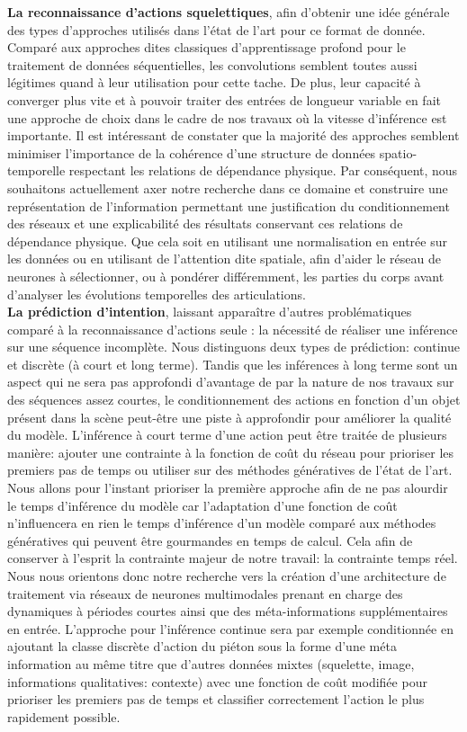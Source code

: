 \textbf{La reconnaissance d'actions squelettiques}, afin d'obtenir une idée générale des types d'approches utilisés dans l'état de l'art pour ce format de donnée. Comparé aux approches dites classiques d'apprentissage profond pour le traitement de données séquentielles, les convolutions semblent toutes aussi légitimes quand à leur utilisation pour cette tache. De plus, leur capacité à converger plus vite et à pouvoir traiter des entrées de longueur variable en fait une approche de choix dans le cadre de nos travaux où la vitesse d'inférence est importante. Il est intéressant de constater que la majorité des approches semblent minimiser l'importance de la cohérence d'une structure de données spatio-temporelle respectant les relations de dépendance physique. Par conséquent, nous souhaitons actuellement axer notre recherche dans ce domaine et construire une représentation de l'information permettant une justification du conditionnement des réseaux et une explicabilité des résultats conservant ces relations de dépendance physique. Que cela soit en utilisant une normalisation en entrée sur les données ou en utilisant de l'attention dite spatiale, afin d'aider le réseau de neurones à sélectionner, ou à pondérer différemment, les parties du corps avant d'analyser les évolutions temporelles des articulations. \\


\textbf{La prédiction d'intention}, laissant apparaître d'autres problématiques comparé à la reconnaissance d'actions seule : la nécessité de réaliser une inférence sur une séquence incomplète. Nous distinguons deux types de prédiction: continue et discrète (à court et long terme). Tandis que les inférences à long terme sont un aspect qui ne sera pas approfondi d'avantage de par la nature de nos travaux sur des séquences assez courtes, le conditionnement des actions en fonction d'un objet présent dans la scène peut-être une piste à approfondir pour améliorer la qualité du modèle.
L'inférence à court terme d'une action peut être traitée de plusieurs manière: ajouter une contrainte à la fonction de coût du réseau pour prioriser les premiers pas de temps ou utiliser sur des méthodes génératives de l'état de l'art. Nous allons pour l'instant prioriser la première approche afin de ne pas alourdir le temps d'inférence du modèle car l'adaptation d'une fonction de coût n'influencera en rien le temps d'inférence d'un modèle comparé aux méthodes génératives qui peuvent être gourmandes en temps de calcul. Cela afin de conserver à l'esprit la contrainte majeur de notre travail: la contrainte temps réel.
Nous nous orientons donc notre recherche vers la création d'une architecture de traitement via réseaux de neurones multimodales prenant en charge des dynamiques à périodes courtes ainsi que des méta-informations supplémentaires en entrée. L'approche pour l'inférence continue sera par exemple conditionnée en ajoutant la classe discrète d'action du piéton sous la forme d'une méta information au même titre que d'autres données mixtes (squelette, image, informations qualitatives: contexte) avec une fonction de coût modifiée pour prioriser les premiers pas de temps et classifier correctement l'action le plus rapidement possible. \\